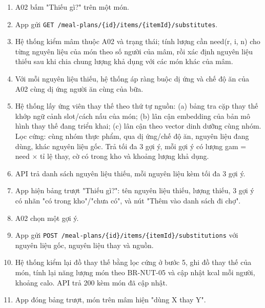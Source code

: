 \begin{enumerate}
\item A02 bấm "Thiếu gì?" trên một món.
\item App gửi {\small\texttt{GET /\allowbreak{}\allowbreak{}meal-\allowbreak{}plans/\allowbreak{}\allowbreak{}\{id\}/\allowbreak{}\allowbreak{}items/\allowbreak{}\allowbreak{}\{itemId\}/\allowbreak{}\allowbreak{}substitutes}}.
\item Hệ thống kiểm mâm thuộc A02 và trạng thái; tính lượng cần need(r, i, n) cho từng nguyên liệu của món theo số người của mâm, rồi xác định nguyên liệu thiếu sau khi chia chung lượng khả dụng với các món khác của mâm.
\item Với mỗi nguyên liệu thiếu, hệ thống áp ràng buộc dị ứng và chế độ ăn của A02 cùng dị ứng người ăn cùng của bữa.
\item Hệ thống lấy ứng viên thay thế theo thứ tự nguồn: (a) bảng tra cặp thay thế khớp ngữ cảnh slot/\allowbreak{}cách nấu của món; (b) lân cận embedding của bản mô hình thay thế đang triển khai; (c) lân cận theo vector dinh dưỡng cùng nhóm. Lọc cứng: cùng nhóm thực phẩm, qua dị ứng/\allowbreak{}chế độ ăn, nguyên liệu đang dùng, khác nguyên liệu gốc. Trả tối đa 3 gợi ý, mỗi gợi ý có lượng gam = need \ensuremath{\times} tỉ lệ thay, cờ có trong kho và khoảng lượng khả dụng.
\item API trả danh sách nguyên liệu thiếu, mỗi nguyên liệu kèm tối đa 3 gợi ý.
\item App hiện bảng trượt "Thiếu gì?": tên nguyên liệu thiếu, lượng thiếu, 3 gợi ý có nhãn "có trong kho"/\allowbreak{}"chưa có", và nút "Thêm vào danh sách đi chợ".
\item A02 chọn một gợi ý.
\item App gửi {\small\texttt{POST /\allowbreak{}\allowbreak{}meal-\allowbreak{}plans/\allowbreak{}\allowbreak{}\{id\}/\allowbreak{}\allowbreak{}items/\allowbreak{}\allowbreak{}\{itemId\}/\allowbreak{}\allowbreak{}substitutions}} với nguyên liệu gốc, nguyên liệu thay và nguồn.
\item Hệ thống kiểm lại đồ thay thế bằng lọc cứng ở bước 5, ghi đồ thay thế của món, tính lại năng lượng món theo BR-\allowbreak{}NUT-\allowbreak{}05 và cập nhật kcal mỗi người, khoảng calo. API trả 200 kèm món đã cập nhật.
\item App đóng bảng trượt, món trên mâm hiện "dùng X thay Y".
\end{enumerate}
